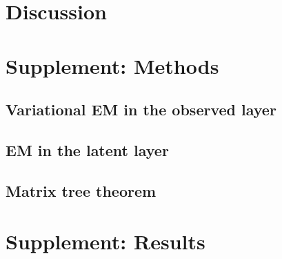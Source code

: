 \section{Discussion} 
\begin{subappendices}
\section{Supplement: Methods}
\subsection{Variational EM in the observed layer} \label{app:VEM} 
\subsection{EM in the latent layer} \label{app:EM} 
\subsection{Matrix tree theorem}\label{app:MTT} 
\section{Supplement: Results}
\label{app:results} 
\end{subappendices}

